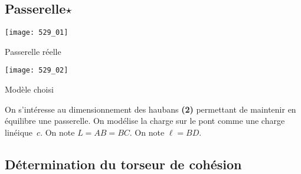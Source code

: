 \normaltrue
\correctionfalse


\subsection*{Passerelle$\star$ \label{C2:10:Coh:529}}
\setcounter{question}{0}

\ifcorrection
\else
{}
\fi



\begin{marginfigure}
\texttt{[image: 529\_01]}

\caption{Passerelle réelle}
\end{marginfigure}

\begin{marginfigure}
\texttt{[image: 529\_02]}

\caption{Modèle choisi}
\end{marginfigure}

On s'intéresse au dimensionnement des haubans \textbf{(2)} permettant de maintenir en équilibre une passerelle.
On modélise la charge sur le pont comme une charge linéique~$c$. On note $L = AB = BC$. On note $\ell = BD$.

\subsection*{Détermination du torseur de cohésion}
\ifprof
\begin{corrige}~\\
\end{corrige}
\else
\fi

\ifprof
\begin{corrige}~\\
\end{corrige}
\else
\fi

\ifprof
\begin{corrige}~\\
\end{corrige}
\else
\fi

